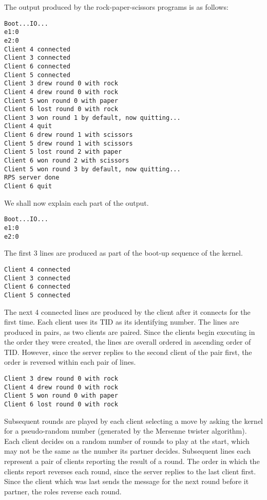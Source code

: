\documentclass[titlepage]{article}
\begin{document}
The output produced by the rock-paper-scissors programs is as follows:

\begin{verbatim}
Boot...IO...
e1:0
e2:0
Client 4 connected
Client 3 connected
Client 6 connected
Client 5 connected
Client 3 drew round 0 with rock
Client 4 drew round 0 with rock
Client 5 won round 0 with paper
Client 6 lost round 0 with rock
Client 3 won round 1 by default, now quitting...
Client 4 quit
Client 6 drew round 1 with scissors
Client 5 drew round 1 with scissors
Client 5 lost round 2 with paper
Client 6 won round 2 with scissors
Client 5 won round 3 by default, now quitting...
RPS server done
Client 6 quit
\end{verbatim}

We shall now explain each part of the output.

\begin{verbatim}
Boot...IO...
e1:0
e2:0
\end{verbatim}

The first 3 lines are produced as part of the boot-up sequence of the kernel.

\begin{verbatim}
Client 4 connected
Client 3 connected
Client 6 connected
Client 5 connected
\end{verbatim}

The next 4 connected lines are produced by the client after it connects for
the first time.
Each client uses its TID as its identifying number.
The lines are produced in pairs, as two clients are paired.
Since the clients begin executing in the order they were created, the lines are
overall ordered in ascending order of TID\@.
However, since the server replies to the second client of the pair first,
the order is reversed within each pair of lines.

\begin{verbatim}
Client 3 drew round 0 with rock
Client 4 drew round 0 with rock
Client 5 won round 0 with paper
Client 6 lost round 0 with rock
\end{verbatim}

Subsequent rounds are played by each client selecting a move by asking the kernel
for a pseudo-random number (generated by the Mersenne twister algorithm).
Each client decides on a random number of rounds to play at the start, which may not
be the same as the number its partner decides.
Subsequent lines each represent a pair of clients reporting the result of a round.
The order in which the clients report reverses each round, since the server replies to
the last client first.
Since the client which was last sends the message for the next round before it partner,
the roles reverse each round.
\end{document}

